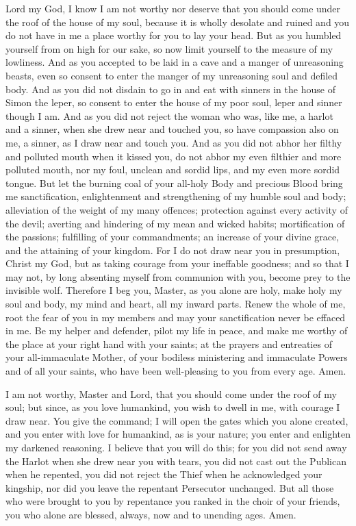 Lord my God, I know I am not worthy nor deserve that you should come under the roof of the house of my soul, because it is wholly desolate and ruined and you do not have in me a place worthy for you to lay your head. But as you humbled yourself from on high for our sake, so now limit yourself to the measure of my lowliness. And as you accepted to be laid in a cave and a manger of unreasoning beasts, even so consent to enter the manger of my unreasoning soul and defiled body. And as you did not disdain to go in and eat with sinners in the house of Simon the leper, so consent to enter the house of my poor soul, leper and sinner though I am. And as you did not reject the woman who was, like me, a harlot and a sinner, when she drew near and touched you, so have compassion also on me, a sinner, as I draw near and touch you. And as you did not abhor her filthy and polluted mouth when it kissed you, do not abhor my even filthier and more polluted mouth, nor my foul, unclean and sordid lips, and my even more sordid tongue. But let the burning coal of your all-holy Body and precious Blood bring me sanctification, enlightenment and strengthening of my humble soul and body; alleviation of the weight of my many offences; protection against every activity of the devil; averting and hindering of my mean and wicked habits; mortification of the passions; fulfilling of your commandments; an increase of your divine grace, and the attaining of your kingdom. For I do not draw near you in presumption, Christ my God, but as taking courage from your ineffable goodness; and so that I may not, by long absenting myself from communion with you, become prey to the invisible wolf. Therefore I beg you, Master, as you alone are holy, make holy my soul and body, my mind and heart, all my inward parts. Renew the whole of me, root the fear of you in my members and may your sanctification never be effaced in me. Be my helper and defender, pilot my life in peace, and make me worthy of the place at your right hand with your saints; at the prayers and entreaties of your all-immaculate Mother, of your bodiless ministering and immaculate Powers and of all your saints, who have been well-pleasing to you from every age. Amen.


I am not worthy, Master and Lord, that you should come under the roof of my soul; but since, as you love humankind, you wish to dwell in me, with courage I draw near. You give the command; I will open the gates which you alone created, and you enter with love for humankind, as is your nature; you enter and enlighten my darkened reasoning. I believe that you will do this; for you did not send away the Harlot when she drew near you with tears, you did not cast out the Publican when he repented, you did not reject the Thief when he acknowledged your kingship, nor did you leave the repentant Persecutor unchanged. But all those who were brought to you by repentance you ranked in the choir of your friends, you who alone are blessed, always, now and to unending ages. Amen.

